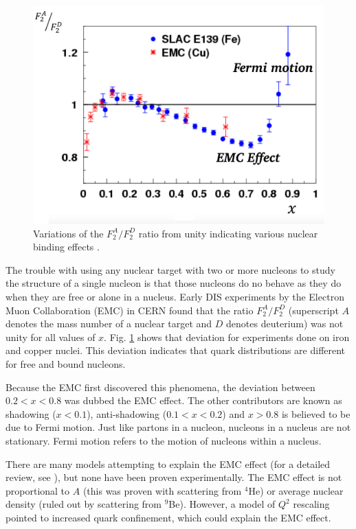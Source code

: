 \begin{figure}[h!]
	\centering
	\includegraphics[width=0.9\linewidth]{figures/EMC.png}
	\caption[Variations of the $F_2^A/F_2^D$ ratio from unity indicating various nuclear binding effects.]{Variations of the $F_2^A/F_2^D$ ratio from unity indicating various nuclear binding effects \cite{emc1}\cite{emc2}.}
	\label{fig:emc}
\end{figure}

The trouble with using any nuclear target with two or more nucleons to study the structure of a single nucleon is that those nucleons do no behave as they do when they are free or alone in a nucleus. Early DIS experiments by the Electron Muon Collaboration (EMC) in CERN found that the ratio $F_2^A/F_2^D$ (superscript $A$ denotes the mass number of a nuclear target and $D$ denotes deuterium) was not unity for all values of $x$. Fig. \ref{fig:emc} shows that deviation for experiments done on iron and copper nuclei. This deviation indicates that quark distributions are different for free and bound nucleons.

Because the EMC first discovered this phenomena, the deviation between $0.2<x<0.8$ was dubbed the EMC effect. The other contributors are known as shadowing ($x<0.1$), anti-shadowing ($0.1<x<0.2$) and $x>0.8$ is believed to be due to Fermi motion. Just like partons in a nucleon, nucleons in a nucleus are not stationary. Fermi motion refers to the motion of nucleons within a nucleus.

There are many models attempting to explain the EMC effect (for a detailed review, see \cite{emc_rev}), but none have been proven experimentally. The EMC effect is not proportional to $A$ (this was proven with scattering from $^4$He) or average nuclear density (ruled out by scattering from $^9$Be). However, a model of $Q^2$ rescaling pointed to increased quark confinement, which could explain the EMC effect.\cite{emc_rev}


